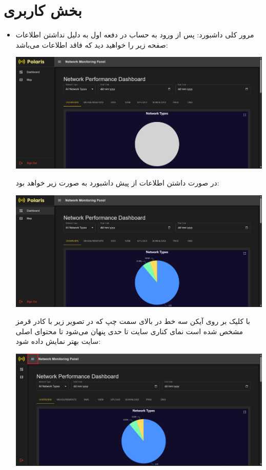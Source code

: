     \section{بخش کاربری}
    \begin{itemize}
    	\item  مرور کلی داشبورد: پس از ورود به حساب در دفعه اول به دلیل نداشتن اطلاعات صفحه زیر را خواهید دید که فاقد اطلاعات می‌باشد:
    		\begin{center}
    			\includegraphics[width=\textwidth]{images/fr-dashboard-empty.png}
    		\end{center}
   		در صورت داشتن اطلاعات از پیش داشبورد به صورت زیر خواهد بود:
	   		\begin{center}
	   			\includegraphics[width=\textwidth]{images/fr-dashboard-filled.png}
	   		\end{center}
	   	با کلیک بر روی آیکن سه خط در بالای سمت چپ که در تصویر زیر با کادر قرمز مشخص شده است نمای کناری سایت تا حدی پنهان می‌شود تا محتوای اصلی سایت بهتر نمایش داده شود:
	   		\begin{center}
				\includegraphics[width=\textwidth]{images/fr-dashboard-without-sidebar.png}

\end{center}
\end{itemize}
